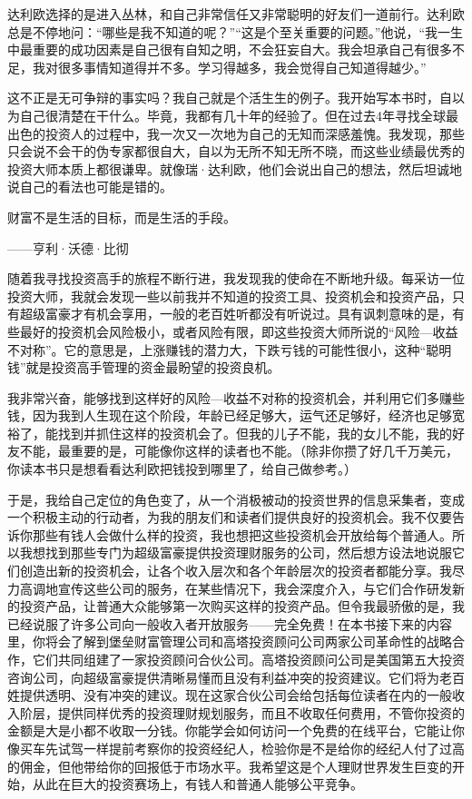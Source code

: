 达利欧选择的是进入丛林，和自己非常信任又非常聪明的好友们一道前行。达利欧总是不停地问：“哪些是我不知道的呢？”“这是个至关重要的问题。”他说，“我一生中最重要的成功因素是自己很有自知之明，不会狂妄自大。我会坦承自己有很多不足，我对很多事情知道得并不多。学习得越多，我会觉得自己知道得越少。”

这不正是无可争辩的事实吗？我自己就是个活生生的例子。我开始写本书时，自以为自己很清楚在干什么。毕竟，我都有几十年的经验了。但在过去4年寻找全球最出色的投资人的过程中，我一次又一次地为自己的无知而深感羞愧。我发现，那些只会说不会干的伪专家都很自大，自以为无所不知无所不晓，而这些业绩最优秀的投资大师本质上都很谦卑。就像瑞·达利欧，他们会说出自己的想法，然后坦诚地说自己的看法也可能是错的。

\begin{BookQuote}
财富不是生活的目标，而是生活的手段。

\hfill ——亨利·沃德·比彻
\end{BookQuote}

随着我寻找投资高手的旅程不断行进，我发现我的使命在不断地升级。每采访一位投资大师，我就会发现一些以前我并不知道的投资工具、投资机会和投资产品，只有超级富豪才有机会享用，一般的老百姓听都没有听说过。具有讽刺意味的是，有些最好的投资机会风险极小，或者风险有限，即这些投资大师所说的“风险—收益不对称”。它的意思是，上涨赚钱的潜力大，下跌亏钱的可能性很小，这种“聪明钱”就是投资高手管理的资金最盼望的投资良机。

我非常兴奋，能够找到这样好的风险—收益不对称的投资机会，并利用它们多赚些钱，因为我到人生现在这个阶段，年龄已经足够大，运气还足够好，经济也足够宽裕了，能找到并抓住这样的投资机会了。但我的儿子不能，我的女儿不能，我的好友不能，最重要的是，可能像你这样的读者也不能。（除非你攒了好几千万美元，你读本书只是想看看达利欧把钱投到哪里了，给自己做参考。）

于是，我给自己定位的角色变了，从一个消极被动的投资世界的信息采集者，变成一个积极主动的行动者，为我的朋友们和读者们提供良好的投资机会。我不仅要告诉你那些有钱人会做什么样的投资，我也想把这些投资机会开放给每个普通人。所以我想找到那些专门为超级富豪提供投资理财服务的公司，然后想方设法地说服它们创造出新的投资机会，让各个收入层次和各个年龄层次的投资者都能分享。我尽力高调地宣传这些公司的服务，在某些情况下，我会深度介入，与它们合作研发新的投资产品，让普通大众能够第一次购买这样的投资产品。但令我最骄傲的是，我已经说服了许多公司向一般收入者开放服务——完全免费！在本书接下来的内容里，你将会了解到堡垒财富管理公司和高塔投资顾问公司两家公司革命性的战略合作，它们共同组建了一家投资顾问合伙公司。高塔投资顾问公司是美国第五大投资咨询公司，向超级富豪提供清晰易懂而且没有利益冲突的投资建议。它们将为老百姓提供透明、没有冲突的建议。现在这家合伙公司会给包括每位读者在内的一般收入阶层，提供同样优秀的投资理财规划服务，而且不收取任何费用，不管你投资的金额是大是小都不收取一分钱。你能学会如何访问一个免费的在线平台，它能让你像买车先试驾一样提前考察你的投资经纪人，检验你是不是给你的经纪人付了过高的佣金，但他带给你的回报低于市场水平。我希望这是个人理财世界发生巨变的开始，从此在巨大的投资赛场上，有钱人和普通人能够公平竞争。

